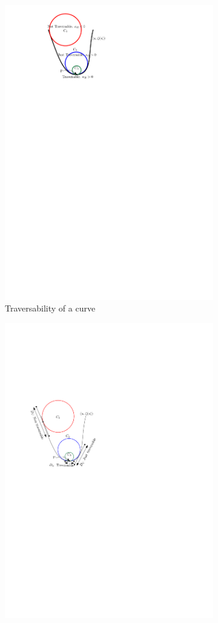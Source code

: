 \documentclass[12pt,a4]{article}
\begin{document}
\begin{figure}[ht!]
\begin{subfigure}{0.31\textwidth}
		\includegraphics[width=0.75\linewidth]{figures/Traversability.pdf}
		\caption{Traversability of a curve \label{fig:is_traversable}}
	\end{subfigure}%
	\begin{subfigure}{0.31\textwidth}
		\centering
		\includegraphics[width=0.85\linewidth]{figures/Traversability2.pdf}

\end{subfigure}
\end{figure}
\end{document}
